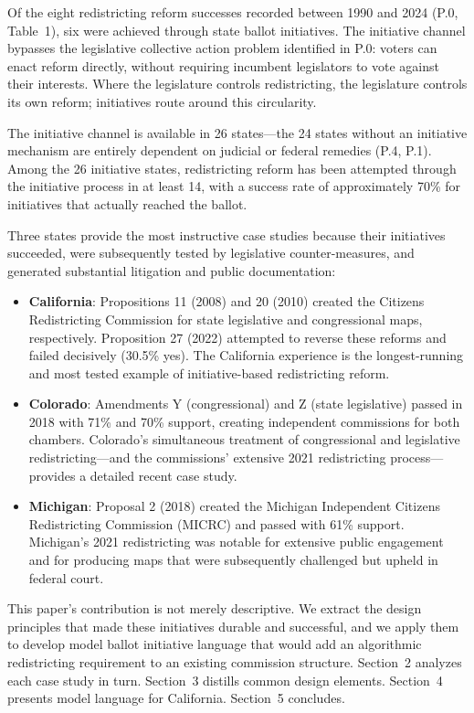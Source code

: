 Of the eight redistricting reform successes recorded between 1990 and 2024 (P.0, Table~1), six were achieved through state ballot initiatives. The initiative channel bypasses the legislative collective action problem identified in P.0: voters can enact reform directly, without requiring incumbent legislators to vote against their interests. Where the legislature controls redistricting, the legislature controls its own reform; initiatives route around this circularity.

The initiative channel is available in 26 states---the 24 states without an initiative mechanism are entirely dependent on judicial or federal remedies (P.4, P.1). Among the 26 initiative states, redistricting reform has been attempted through the initiative process in at least 14, with a success rate of approximately 70\% for initiatives that actually reached the ballot.

Three states provide the most instructive case studies because their initiatives succeeded, were subsequently tested by legislative counter-measures, and generated substantial litigation and public documentation:

\begin{itemize}
  \item \textbf{California}: Propositions 11 (2008) and 20 (2010) created the Citizens Redistricting Commission for state legislative and congressional maps, respectively. Proposition 27 (2022) attempted to reverse these reforms and failed decisively (30.5\% yes). The California experience is the longest-running and most tested example of initiative-based redistricting reform.

  \item \textbf{Colorado}: Amendments Y (congressional) and Z (state legislative) passed in 2018 with 71\% and 70\% support, creating independent commissions for both chambers. Colorado's simultaneous treatment of congressional and legislative redistricting---and the commissions' extensive 2021 redistricting process---provides a detailed recent case study.

  \item \textbf{Michigan}: Proposal 2 (2018) created the Michigan Independent Citizens Redistricting Commission (MICRC) and passed with 61\% support. Michigan's 2021 redistricting was notable for extensive public engagement and for producing maps that were subsequently challenged but upheld in federal court.
\end{itemize}

This paper's contribution is not merely descriptive. We extract the design principles that made these initiatives durable and successful, and we apply them to develop model ballot initiative language that would add an algorithmic redistricting requirement to an existing commission structure. Section~2 analyzes each case study in turn. Section~3 distills common design elements. Section~4 presents model language for California. Section~5 concludes.
